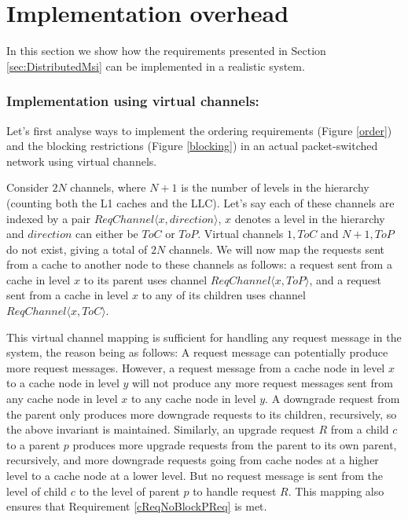\section{Implementation overhead}
\label{sec:implementation}
In this section we show how the requirements presented in Section \ref{sec:DistributedMsi} can be implemented in a realistic system.

\subsubsection{Implementation using virtual channels:}

Let's first analyse ways to implement the ordering requirements (Figure
\ref{order}) and the blocking restrictions (Figure \ref{blocking}) in an actual
packet-switched network using virtual channels.

Consider $2N$ channels, where $N + 1$ is the number of levels in the hierarchy
(counting both the L1 caches and the LLC). Let's say each of these channels are
indexed by a pair $ReqChannel\langle x, direction \rangle$, $x$ denotes a level
in the hierarchy and $direction$ can either be $ToC$ or $ToP$.  Virtual
channels $1, ToC$ and $N + 1, ToP$ do not exist, giving a total of $2N$
channels. We will now map the requests sent from a cache to another node to
these channels as follows: a request sent from a cache in level $x$ to its
parent uses channel $ReqChannel\langle x, ToP \rangle$, and a request sent from
a cache in level $x$ to any of its children uses channel $ReqChannel\langle x,
ToC \rangle$.

This virtual channel mapping is sufficient for handling any request message in
the system, the reason being as follows: A request message can potentially
produce more request messages. However, a request message from a cache node in
level $x$ to a cache node in level $y$ will not produce any more request
messages sent from any cache node in level $x$ to any cache node in level $y$. A
downgrade request from the parent only produces more downgrade requests to its
children, recursively, so the above invariant is maintained. Similarly, an
upgrade request $R$ from a child $c$ to a parent $p$ produces more upgrade
requests from the parent to its own parent, recursively, and more downgrade
requests going from cache nodes at a higher level to a cache node at a lower
level. But no request message is sent from the level of child $c$ to the level
of parent $p$ to handle request $R$. This mapping also ensures that Requirement
\ref{cReqNoBlockPReq} is met.

